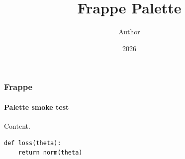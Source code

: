 \documentclass[notheorems,aspectratio=169]{beamer}
\title{Frappe Palette}
\author{Author}
\date{2026}
\begin{document}
\maketitle

\begin{frame}[fragile]
  \frametitle{Frappe}
  \framesubtitle{Palette smoke test}

  Content.

  \begin{verbatim}
def loss(theta):
    return norm(theta)
  \end{verbatim}
\end{frame}
\end{document}
